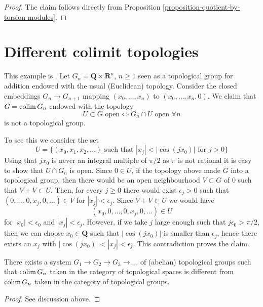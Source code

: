 \begin{proof}
The claim follows directly from
Proposition \ref{proposition-quotient-by-torsion-modules}.
\end{proof}




\section{Different colimit topologies}
\label{section-colimit-topology}

\noindent
This example is \cite[Example 1.2, page 553]{TSH}. Let
$G_n = \mathbf{Q} \times \mathbf{R}^n$, $n \geq 1$ seen as a topological group
for addition endowed with the usual (Euclidean) topology. Consider the closed
embeddings $G_n \to G_{n + 1}$ mapping $(x_0, \ldots, x_n)$ to
$(x_0, \ldots, x_n, 0)$. We claim that $G = \mathop{\mathrm{colim}}\nolimits G_n$ endowed with the
topology
$$
U \subset G\text{ open} \Leftrightarrow G_n \cap U\text{ open }\forall n
$$
is not a topological group.

\medskip\noindent
To see this we consider the set
$$
U = \{(x_0, x_1, x_2, \ldots)\text{ such that }
|x_j| < |\cos(jx_0)| \text{ for } j > 0\}
$$
Using that $jx_0$ is never an integral multiple of $\pi/2$ as $\pi$
is not rational it is easy to show that $U \cap G_n$ is open. Since
$0 \in U$, if the topology above made $G$ into a topological group,
then there would be an open neighbourhood $V \subset G$ of $0$
such that $V + V \subset U$. Then, for every $j \geq 0$ there would
exist $\epsilon_j > 0$ such that $(0, \ldots, 0, x_j, 0, \ldots) \in V$
for $|x_j| < \epsilon_j$. Since $V + V \subset U$ we would have
$$
(x_0, 0, \ldots, 0, x_j, 0, \ldots) \in U
$$
for $|x_0| < \epsilon_0$ and $|x_j| < \epsilon_j$. However, if we
take $j$ large enough such that $j \epsilon_0 > \pi/2$, then we can
choose $x_0 \in \mathbf{Q}$ such that $|\cos(jx_0)|$ is smaller than
$\epsilon_j$, hence there exists an $x_j$ with
$|\cos(jx_0)| < |x_j| < \epsilon_j$. This contradiction proves the claim.

\begin{lemma}
\label{lemma-colimit-topology}
There exists a system $G_1 \to G_2 \to G_3 \to \ldots$ of (abelian)
topological groups such that $\mathop{\mathrm{colim}}\nolimits G_n$ taken in the category of
topological spaces is different from $\mathop{\mathrm{colim}}\nolimits G_n$ taken in the category
of topological groups.
\end{lemma}

\begin{proof}
See discussion above.
\end{proof}






